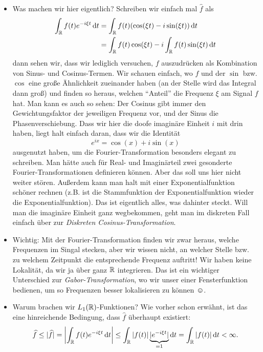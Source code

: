\begin{remark}\leavevmode
\begin{itemize}
\item Was machen wir hier eigentlich? Schreiben wir einfach mal $ \widehat{f} $ als
\begin{align*}
   \int_{\R} f(t) e^{-i\xi t} \dif t
&= \int_{\R} f(t) (\cos(\xi t) - i\sin(\xi t)) \dif t \\
&= \int_{\R} f(t) \cos(\xi t) - i \int_{\R} f(t) \sin(\xi t) \dif t
\end{align*}
dann sehen wir, dass wir lediglich versuchen, $ f $ auszudrücken als Kombination von Sinus- und
Cosinus-Termen. Wir schauen einfach, wo $ f $ und der $ \sin $ bzw. $ \cos $ eine große Ähnlichkeit
zueinander haben (an der Stelle wird das Integral dann groß) und finden so heraus, welchen 
\enquote{Anteil} die Frequenz $ \xi $ am Signal $ f $ hat. Man kann es auch so sehen: Der Cosinus 
gibt immer den Gewichtungsfaktor der jeweiligen Frequenz vor, und der Sinus die Phasenverschiebung. 
Dass wir hier die doofe imaginäre Einheit $ i $ mit drin haben, liegt halt einfach daran, dass wir 
die Identität
\[
  e^{ix} = \cos(x) + i \sin(x)
\]
ausgenutzt haben, um die Fourier-Transformation besonders elegant zu schreiben. Man hätte auch für
Real- und Imaginärteil zwei gesonderte Fourier-Transformationen definieren können. Aber das soll uns
hier nicht weiter stören. Außerdem kann man halt mit einer Exponentialfunktion schöner rechnen 
(z.B. ist die Stammfunktion der Exponentialfunktion wieder die Exponentialfunktion). Das ist 
eigentlich alles, was dahinter steckt. Will man die imaginäre Einheit ganz wegbekommen, geht man 
im diskreten Fall einfach über zur \emph{Diskreten Cosinus-Transformation}.
\item Wichtig: Mit der Fourier-Transformation finden wir zwar heraus, welche Frequenzen im Singal 
stecken,
aber wir wissen nicht, an welcher Stelle bzw. zu welchem Zeitpunkt die entsprechende Frequenz 
auftritt! Wir haben keine Lokalität, da wir ja über ganz $ \mathbb{R} $ integrieren. Das ist ein wichtiger 
Unterschied zur \emph{Gabor-Transformation}, wo wir unser einer Fensterfunktion bedienen, um so 
Frequenzen besser lokalisieren zu können $ \smiley $.
\item Warum brachen wir $ L_{1}(\mathbb{R}) $-Funktionen? Wie vorher schon erwähnt, ist das eine 
hinreichende Bedingung, dass $ \widehat{f} $ überhaupt existiert:
\[
  \widehat{f} \leq |\widehat{f}| = \left| \int_{\R} f(t) e^{-i\xi t} \dif t \right|
  \leq \int_{\R} |f(t)| \underbrace{|e^{-i\xi t}|}_{= 1} \dif t = \int_{\R} |f(t)| \dif t < \infty.
\]
\end{itemize}
\end{remark}
